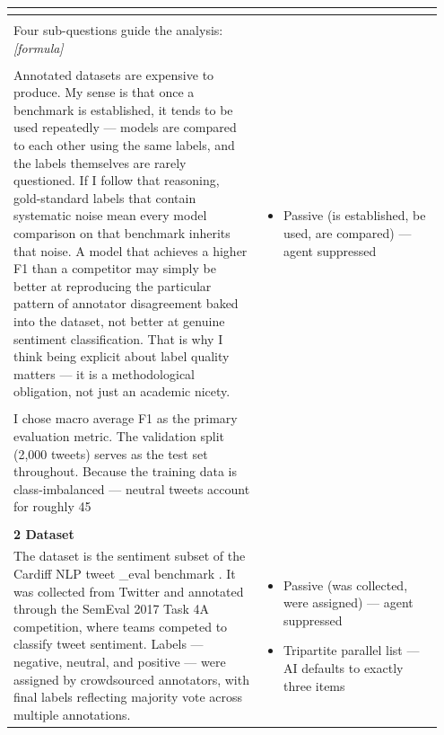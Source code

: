 \documentclass[11pt]{article}
\begin{document}
\begin{longtable}{|p{0.55\linewidth}|p{0.40\linewidth}|}
\begin{itemize}[leftmargin=1em,itemsep=1pt,topsep=1pt,parsep=0pt]
\end{itemize} \\[2pt]
\hline
\rule{0pt}{3.5cm} & \\
\hline
Four sub-questions guide the analysis: \textit{[formula]} &  \\[2pt]
\hline
\rule{0pt}{3.5cm} & \\
\hline
Annotated datasets are expensive to produce. My sense is that once a benchmark is established, it tends to be used repeatedly --- models are compared to each other using the same labels, and the labels themselves are rarely questioned. If I follow that reasoning, gold-standard labels that contain systematic noise mean every model comparison on that benchmark inherits that noise. A model that achieves a higher F1 than a competitor may simply be better at reproducing the particular pattern of annotator disagreement baked into the dataset, not better at genuine sentiment classification. That is why I think being explicit about label quality matters --- it is a methodological obligation, not just an academic nicety. & \begin{itemize}[leftmargin=1em,itemsep=1pt,topsep=1pt,parsep=0pt]
  \item Passive (is established, be used, are compared) --- agent suppressed
\end{itemize} \\[2pt]
\hline
\rule{0pt}{3.5cm} & \\
\hline
I chose macro average F1 as the primary evaluation metric. The validation split (2,000 tweets) serves as the test set throughout. Because the training data is class-imbalanced --- neutral tweets account for roughly 45 &  \\[2pt]
\hline
\rule{0pt}{3.5cm} & \\
\hline
\textbf{2 Dataset}\\[4pt]
The dataset is the sentiment subset of the Cardiff NLP tweet \_eval benchmark . It was collected from Twitter and annotated through the SemEval 2017 Task 4A competition, where teams competed to classify tweet sentiment. Labels --- negative, neutral, and positive --- were assigned by crowdsourced annotators, with final labels reflecting majority vote across multiple annotations. & \begin{itemize}[leftmargin=1em,itemsep=1pt,topsep=1pt,parsep=0pt]
  \item Passive (was collected, were assigned) --- agent suppressed
  \item Tripartite parallel list --- AI defaults to exactly three items

\end{itemize}
\end{longtable}
\end{document}
